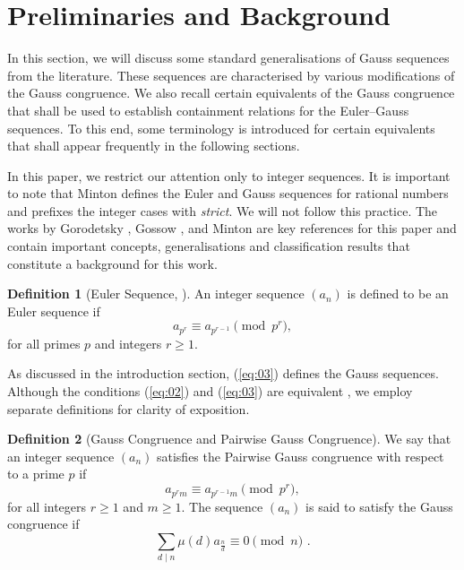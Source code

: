 \documentclass{article}
\numberwithin{equation}{section}
\theoremstyle{definition}
\newtheorem{definition}{\bf {Definition}}[section]
\begin{document}
\section{Preliminaries and Background}\label{sec:1.1}
 
In this section, we will discuss some standard generalisations of Gauss sequences from the literature. These sequences are characterised by various modifications of the Gauss congruence. 
We also recall certain equivalents of the Gauss congruence that shall be used to establish containment relations for the Euler--Gauss sequences. To this end, some terminology is introduced for certain equivalents that shall appear frequently in the following sections.

 
In this paper, we restrict our attention only to integer sequences. 
It is important to note that Minton \cite{minton_gauss} defines the Euler and Gauss sequences for rational numbers and prefixes the integer cases with \emph{strict}. We will not follow this practice. The works by Gorodetsky \cite{goro_q-gauss}, Gossow \cite{fern_gauss}, and Minton \cite{minton_gauss} are key references for this paper and contain important concepts, generalisations and classification results that constitute a background for this work.
 

\begin{definition}[Euler Sequence, \cite{minton_gauss}]
    An integer sequence $(a_n)$ is defined to be an Euler sequence if 
    \begin{equation}\label{eq:06}
        a_{p^r}\equiv a_{p^{r-1}}\pmod{p^r},
    \end{equation}
    for all primes $p$ and integers $r\geq1$. 
\end{definition}

As discussed in the introduction section, (\ref{eq:03}) defines the Gauss sequences. Although the conditions (\ref{eq:02}) and (\ref{eq:03}) are equivalent \cite[Exercise 5.2(a)]{stanley_2}, we employ separate definitions for clarity of exposition. 
\begin{definition}[Gauss Congruence and Pairwise Gauss Congruence]
We say that an integer sequence $(a_n)$ satisfies the Pairwise Gauss congruence with respect to a prime $p$ if  
    \begin{equation}\label{eq:07}
        a_{p^rm}\equiv a_{p^{r-1}m}\pmod{p^r},
    \end{equation}
for all integers $r\geq1$ and $m\geq1$. The sequence $(a_{n})$ is said to satisfy the Gauss congruence if 
\begin{equation}\label{eq:071}
    \sum_{d\mid n}\mu(d)a_\frac{n}{d}\equiv0\pmod{n}\text{ .}
\end{equation}
\end{definition}
\end{document}

